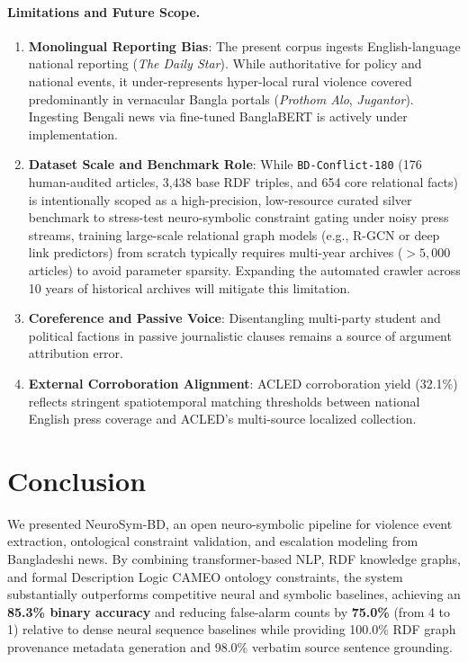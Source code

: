 \documentclass[11pt,a4paper]{article}
\begin{document}
\paragraph{Limitations and Future Scope.}
\begin{enumerate}
  \item \textbf{Monolingual Reporting Bias}: The present corpus ingests English-language national reporting (\textit{The Daily Star}). While authoritative for policy and national events, it under-represents hyper-local rural violence covered predominantly in vernacular Bangla portals (\textit{Prothom Alo}, \textit{Jugantor}). Ingesting Bengali news via fine-tuned BanglaBERT is actively under implementation.
  \item \textbf{Dataset Scale and Benchmark Role}: While \texttt{BD-Conflict-180} (176 human-audited articles, 3,438 base RDF triples, and 654 core relational facts) is intentionally scoped as a high-precision, low-resource curated silver benchmark to stress-test neuro-symbolic constraint gating under noisy press streams, training large-scale relational graph models (e.g., R-GCN or deep link predictors) from scratch typically requires multi-year archives ($>5,000$ articles) to avoid parameter sparsity. Expanding the automated crawler across 10 years of historical archives will mitigate this limitation.
  \item \textbf{Coreference and Passive Voice}: Disentangling multi-party student and political factions in passive journalistic clauses remains a source of argument attribution error.
  \item \textbf{External Corroboration Alignment}: ACLED corroboration yield (32.1\%) reflects stringent spatiotemporal matching thresholds between national English press coverage and ACLED's multi-source localized collection.
\end{enumerate}

\section{Conclusion}
\label{sec:conclusion}

We presented NeuroSym-BD, an open neuro-symbolic pipeline for
violence event extraction, ontological constraint validation, and escalation modeling from Bangladeshi news.
By combining transformer-based NLP, RDF knowledge graphs, and formal Description Logic CAMEO ontology constraints,
the system substantially outperforms competitive neural and symbolic baselines, achieving an \textbf{85.3\% binary accuracy}
and reducing false-alarm counts by \textbf{75.0\%} (from 4 to 1) relative to dense neural sequence baselines while providing 100.0\% RDF graph provenance metadata generation and 98.0\% verbatim source sentence grounding.
\end{document}
